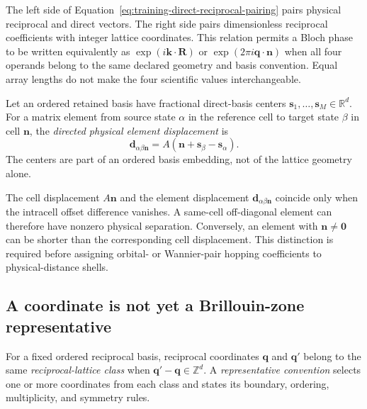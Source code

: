 The left side of Equation~\eqref{eq:training-direct-reciprocal-pairing} pairs
physical reciprocal and direct vectors. The right side pairs dimensionless
reciprocal coefficients with integer lattice coordinates. This relation permits
a Bloch phase to be written equivalently as $\exp(i\mathbf k\cdot\mathbf R)$ or
$\exp(2\pi i\mathbf q\cdot\mathbf n)$ when all four operands belong to the same
declared geometry and basis convention. Equal array lengths do not make the
four scientific values interchangeable.

\begin{definition}
\label{def:training-embedded-basis-element-displacement}
Let an ordered retained basis have fractional direct-basis centers
$\mathbf s_1,\ldots,\mathbf s_M\in\mathbb R^d$. For a matrix element from
source state $\alpha$ in the reference cell to target state $\beta$ in cell
$\mathbf n$, the \emph{directed physical element displacement} is
\begin{equation}
  \mathbf d_{\alpha\beta\mathbf n}
  =A\left(\mathbf n+\mathbf s_\beta-\mathbf s_\alpha\right).
  \label{eq:training-embedded-basis-element-displacement}
\end{equation}
The centers are part of an ordered basis embedding, not of the lattice geometry
alone.
\end{definition}

The cell displacement $A\mathbf n$ and the element displacement
$\mathbf d_{\alpha\beta\mathbf n}$ coincide only when the intracell offset
difference vanishes. A same-cell off-diagonal element can therefore have
nonzero physical separation. Conversely, an element with
$\mathbf n\neq\mathbf0$ can be shorter than the corresponding cell displacement.
This distinction is required before assigning orbital- or Wannier-pair hopping
coefficients to physical-distance shells.

\subsection{A coordinate is not yet a Brillouin-zone representative}

\begin{definition}
\label{def:training-reciprocal-class-representative}
For a fixed ordered reciprocal basis, reciprocal coordinates $\mathbf q$ and
$\mathbf q'$ belong to the same \emph{reciprocal-lattice class} when
$\mathbf q'-\mathbf q\in\mathbb Z^d$. A \emph{representative convention}
selects one or more coordinates from each class and states its boundary,
ordering, multiplicity, and symmetry rules.
\end{definition}

